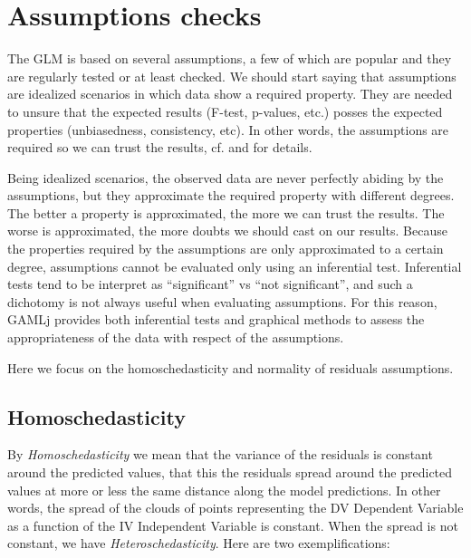 \documentclass[
]{book}
\begin{document}
\hypertarget{assumptions-checks}{%
\section{Assumptions checks}\label{assumptions-checks}}

The GLM is based on several assumptions, a few of which are popular and they are regularly tested or at least checked. We should start saying that assumptions are idealized scenarios in which data show a required property. They are needed to unsure that the expected results (F-test, p-values, etc.) posses the expected properties (unbiasedness, consistency, etc). In other words, the assumptions are required so we can trust the results, cf. \citet{nimon} and \citet{glass1972consequences} for details.

Being idealized scenarios, the observed data are never perfectly abiding by the assumptions, but they approximate the required property with different degrees. The better a property is approximated, the more we can trust the results. The worse is approximated, the more doubts we should cast on our results. Because the properties required by the assumptions are only approximated to a certain degree, assumptions cannot be evaluated only using an inferential test. Inferential tests tend to be interpret as ``significant'' vs ``not significant'', and such a dichotomy is not always useful when evaluating assumptions. For this reason, {GAMLj} provides both inferential tests and graphical methods to assess the appropriateness of the data with respect of the assumptions.

Here we focus on the homoschedasticity and normality of residuals assumptions.

\hypertarget{homosched}{%
\subsection{Homoschedasticity}\label{homosched}}

By \emph{Homoschedasticity} we mean that the variance of the residuals is constant around the predicted values, that this the residuals spread around the predicted values at more or less the same distance along the model predictions. In other words, the spread of the clouds of points representing the {DV {Dependent Variable} } as a function of the {IV {Independent Variable} } is constant. When the spread is not constant, we have \emph{Heteroschedasticity}. Here are two exemplifications:
\end{document}
